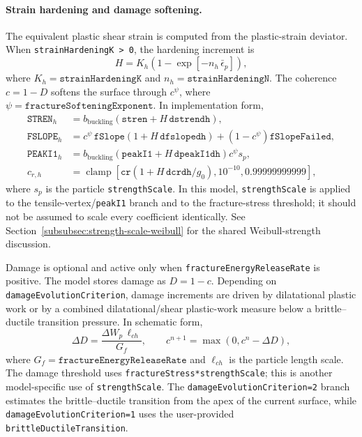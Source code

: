 \paragraph{Strain hardening and damage softening.}
The equivalent plastic shear strain is computed from the plastic-strain deviator.  When \texttt{strainHardeningK > 0}, the hardening increment is
\begin{equation}
  H = K_h\left(1-\exp[-n_h\,\bar\epsilon_p]\right),
  \label{eq:geomechanics-hardening}
\end{equation}
where \(K_h=\texttt{strainHardeningK}\) and \(n_h=\texttt{strainHardeningN}\).  The coherence \(c=1-D\) softens the surface through \(c^\psi\), where \(\psi=\texttt{fractureSofteningExponent}\).  In implementation form,
\begin{align}
  \texttt{STREN}_h &= b_{\mathrm{buckling}}\left(\texttt{stren}+H\,\texttt{dstrendh}\right),\\
  \texttt{FSLOPE}_h &= c^\psi\,\texttt{fSlope}\left(1+H\,\texttt{dfslopedh}\right)
  +\left(1-c^\psi\right)\texttt{fSlopeFailed},\\
  \texttt{PEAKI1}_h &= b_{\mathrm{buckling}}\left(\texttt{peakI1}+H\,\texttt{dpeakI1dh}\right)c^\psi s_p,\\
  c_{r,h} &= \operatorname{clamp}\left[\texttt{cr}\left(1+H\,\texttt{dcrdh}/g_0\right),10^{-10},0.99999999999\right],
  \label{eq:geomechanics-hardening-parameters}
\end{align}
where \(s_p\) is the particle \texttt{strengthScale}.  In this model, \texttt{strengthScale} is applied to the tensile-vertex/\texttt{peakI1} branch and to the fracture-stress threshold; it should not be assumed to scale every coefficient identically.  See Section~\ref{subsubsec:strength-scale-weibull} for the shared Weibull-strength discussion.

Damage is optional and active only when \texttt{fractureEnergyReleaseRate} is positive.  The model stores damage as \(D=1-c\).  Depending on \texttt{damageEvolutionCriterion}, damage increments are driven by dilatational plastic work or by a combined dilatational/shear plastic-work measure below a brittle--ductile transition pressure.  In schematic form,
\begin{equation}
  \Delta D = \frac{\Delta W_p\,\ell_{ch}}{G_f}, \qquad
  c^{n+1}=\max(0,c^n-\Delta D),
  \label{eq:geomechanics-damage}
\end{equation}
where \(G_f=\texttt{fractureEnergyReleaseRate}\) and \(\ell_{ch}\) is the particle length scale.  The damage threshold uses \texttt{fractureStress*strengthScale}; this is another model-specific use of \texttt{strengthScale}.  The \texttt{damageEvolutionCriterion=2} branch estimates the brittle--ductile transition from the apex of the current surface, while \texttt{damageEvolutionCriterion=1} uses the user-provided \texttt{brittleDuctileTransition}.

